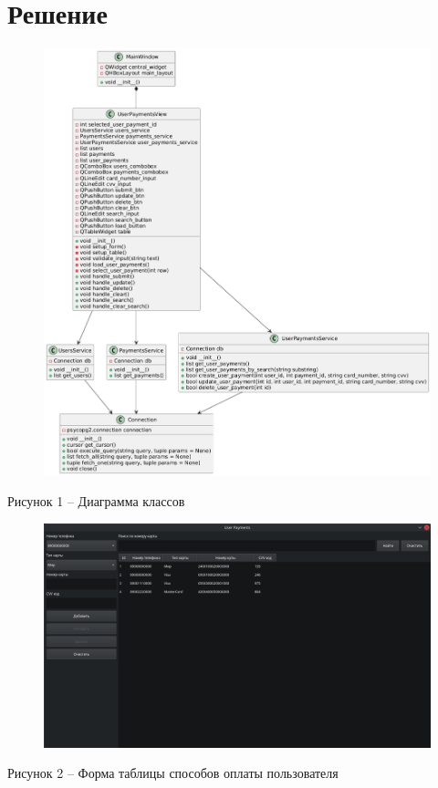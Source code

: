 \documentclass[a4paper,14pt]{extarticle}
\begin{document}
  \section*{Решение}
  \begin{figure}[h]
    \centering
    \includegraphics[width=1\linewidth]{img/uml-python.png}
  \end{figure}
  \begin{center}
    Рисунок 1 – Диаграмма классов
  \end{center}

  \pagebreak
  \begin{figure}[h]
    \centering
    \includegraphics[width=0.95\linewidth]{img/f-1}
  \end{figure}
  \begin{center}
    Рисунок 2 – Форма таблицы способов оплаты пользователя
  \end{center}
\end{document}
